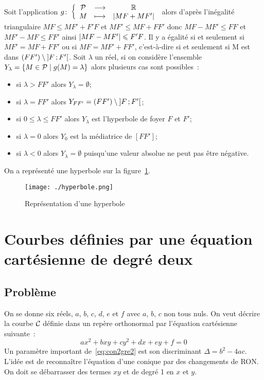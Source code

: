 Soit l'application $g\colon \left\{\begin{array}{ccc} \mathcal{P} & \longrightarrow &\mathbb{R}\\ M & \longmapsto & \left\lvert MF+MF'\right\rvert \end{array} \right.$ alors d'après l'inégalité triangulaire $MF \leqslant MF'+F'F$ et $MF'\leqslant MF+FF'$ donc $MF-MF'\leqslant FF$ et $MF'-MF\leqslant FF'$ ainsi $\left\lvert MF-MF'\right\rvert\leqslant F'F$. Il y a égalité si et seulement si $MF'=MF+FF'$ ou si $MF=MF'+FF'$, c'est-à-dire si et seulement si M est dans $(FF') \setminus \left] F \, ;  F' \right[$. Soit $\lambda$ un réel, si on considère l'ensemble $Y_{\lambda}=\left\{M \in \mathcal{P}\mathrel{}\middle|\mathrel{}g(M)=\lambda\right\}$ alors plusieurs cas sont possibles~:
\begin{itemize}
\item si $\lambda>FF'$ alors $Y_{\lambda}=\emptyset$;
\item si $\lambda=FF'$ alors $Y_{FF'}=(FF') \setminus \left] F \, ;  F' \right[$;
\item si $0\leqslant\lambda\leqslant FF'$ alors $Y_{\lambda}$ est l'hyperbole de foyer $F$ et $F'$;
\item si $\lambda=0$ alors $Y_{0}$ est la médiatrice de $[FF']$;
\item si $\lambda<0$ alors $Y_{\lambda}=\emptyset$ puisqu'une valeur absolue ne peut pas être négative.
\end{itemize}

On a représenté une hyperbole sur la figure~\ref{fig:hyperbole}.

\begin{figure}[!h]
  \centering
  \texttt{[image: ./hyperbole.png]}
  \caption{Représentation d'une hyperbole}
  \label{fig:hyperbole}
\end{figure}


\section{Courbes définies par une équation cartésienne de degré deux}
\label{sec:eqcart}
\subsection{Problème}
On se donne six réels, $a$, $b$, $c$, $d$, $e$ et $f$ avec $a$, $b$, $c$ non tous nuls. On veut décrire la courbe $\mathcal{C}_{{}}$ définie dans un repère orthonormal par l'équation cartésienne suivante~:
\begin{equation}
  ax^2+bxy+cy^2+dx+ey+f=0 \label{eq:con2gre2}
\end{equation}
Un paramètre important de~\eqref{eq:con2gre2} est son discriminant $\Delta=b^2-4ac$. L'idée est de reconnaître l'équation d'une conique par des changements de RON\@. On doit se débarrasser des termes $xy$ et de degré 1 en $x$ et $y$.

